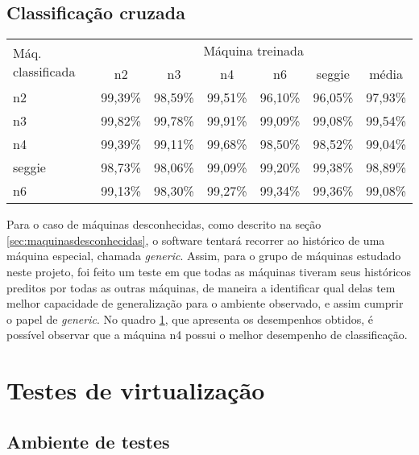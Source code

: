 \subsection{Classificação cruzada}

\begin{table}[htp]
\centering
\hspace{-2cm} %
\label{quadro:clacruzada}
\begin{tabular}{| l | c | c | c | c | c | c |}
\hline
\multirow{2}{*}{Máq. classificada} & \multicolumn{6}{c|}{Máquina treinada} \\
\cline{2-7}
		& n2      & n3       & n4      	 & n6        & seggie  	 & média   \\
\hline
n2      	& 99,39\%  & 98,59\% &   99,51\% &   96,10\% &   96,05\% & 97,93\% \\
n3      	& 99,82\%  & 99,78\% &   99,91\% &   99,09\% &   99,08\% & 99,54\% \\
n4      	& 99,39\%  & 99,11\% &   99,68\% &   98,50\% &   98,52\% & 99,04\% \\
seggie  	& 98,73\%  & 98,06\% &   99,09\% &   99,20\% &   99,38\% & 98,89\% \\
n6      	& 99,13\%  & 98,30\% &   99,27\% &   99,34\% &   99,36\% & 99,08\% \\
\hline
\end{tabular}
\end{table}

Para o caso de máquinas desconhecidas, como descrito na seção
\ref{sec:maquinasdesconhecidas}, o software tentará recorrer ao histórico
de uma máquina especial, chamada \emph{generic}. Assim, para o grupo de
máquinas estudado neste projeto, foi feito um teste em que todas as
máquinas tiveram seus históricos preditos por todas as outras máquinas, de
maneira a identificar qual delas tem melhor capacidade de generalização
para o ambiente observado, e assim cumprir o papel de \emph{generic}. No quadro
\ref{quadro:clacruzada}, que apresenta os desempenhos obtidos, é possível
observar que a máquina n4 possui o melhor desempenho de classificação.

\section{Testes de virtualização}

\subsection{Ambiente de testes}

